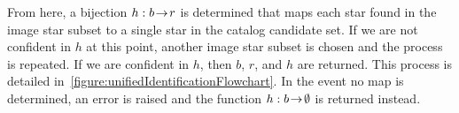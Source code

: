 \documentclass[conference]{IEEEtran}
\begin{document}
    From here, a bijection $h : b \! \rightarrow \! r$ is determined that maps each star found in the image star subset to a
    single star in the catalog candidate set.
    If we are not confident in $h$ at this point, another image star subset is chosen and the process is repeated.
    If we are confident in $h$, then $b$, $r$, and $h$ are returned.
    This process is detailed in~\autoref{figure:unifiedIdentificationFlowchart}.
    In the event no map is determined, an error is raised and the function $h : b \! \rightarrow \! \emptyset$ is returned
    instead.


\end{document}
